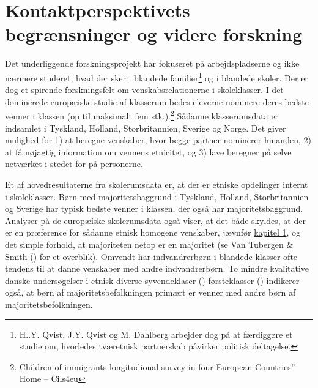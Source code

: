 \documentclass[
]{book}
\begin{document}
\section{Kontaktperspektivets begrænsninger og videre forskning}\label{kontaktperspektivets-begruxe6nsninger-og-videre-forskning}

Det underliggende forskningsprojekt har fokuseret på arbejdspladserne og ikke nærmere studeret, hvad der sker i blandede familier\footnote{H..Y. Qvist, J.Y. Qvist og M. Dahlberg arbejder dog på at færdiggøre et studie om, hvorledes tværetnisk partnerskab påvirker politisk deltagelse.} og i blandede skoler. Der er dog et spirende forskningsfelt om venskabsrelationerne i skoleklasser. I det dominerede europæiske studie af klasserum bedes eleverne nominere deres bedste venner i klassen (op til maksimalt fem stk.).\footnote{Children of immigrants longitudional survey in four European Countries'' Home -- Cils4eu} Sådanne klasserumsdata er indsamlet i Tyskland, Holland, Storbritannien, Sverige og Norge. Det giver mulighed for 1) at beregne venskaber, hvor begge partner nominerer hinanden, 2) at få nøjagtig information om vennens etnicitet, og 3) lave beregner på selve netværket i stedet for på personerne.

Et af hovedresultaterne fra skolerumsdata er, at der er etniske opdelinger internt i skoleklasser. Børn med majoritetsbaggrund i Tyskland, Holland, Storbritannien og Sverige har typisk bedste venner i klassen, der også har majoritetsbaggrund. Analyser på de europæiske skolerumsdata også viser, at det både skyldes, at der er en præference for sådanne etnisk homogene venskaber, jævnfør \hyperref[kap1]{kapitel 1}, og det simple forhold, at majoriteten netop er en majoritet (se Van Tubergen \& Smith () for et overblik). Omvendt har indvandrerbørn i blandede klasser ofte tendens til at danne venskaber med andre indvandrerbørn. To mindre kvalitative danske undersøgelser i etnisk diverse syvendeklaser () førsteklasser () indikerer også, at børn af majoritetsbefolkningen primært er venner med andre børn af majoritetsbefolkningen.
\end{document}
